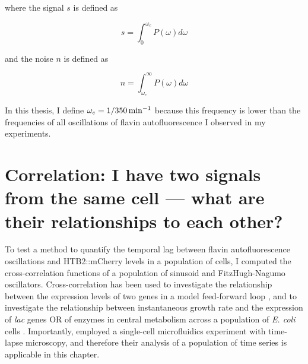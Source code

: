where the signal $s$ is defined as

\begin{equation}
  s = \int_{0}^{\omega_{c}} P(\omega) d\omega
  \label{eq:signal}
\end{equation}

and the noise $n$ is defined as

\begin{equation}
  n = \int_{\omega_{c}}^{\infty} P(\omega) d\omega
  \label{eq:noise}
\end{equation}

In this thesis, I define $\omega_{c} = \SI[parse-numbers=false]{1/350}{\minute^{-1}}$ because this frequency is lower than the frequencies of all oscillations of flavin autofluorescence I observed in my experiments.


\section[Correlation]{Correlation: I have two signals from the same cell --- what are their relationships to each other?}
\label{sec:analysis-correlation}


To test a method to quantify the temporal lag between flavin autofluorescence oscillations and HTB2::mCherry levels in a population of cells, I computed the cross-correlation functions of a population of sinusoid and FitzHugh-Nagumo oscillators.
Cross-correlation has been used to investigate the relationship between the expression levels of two genes in a model feed-forward loop \parencite{dunlopRegulatoryActivityRevealed2008},
and to investigate the relationship between instantaneous growth rate and the expression of \textit{lac} genes OR of enzymes in central metabolism across a population of \textit{E. coli} cells \parencite{kivietStochasticityMetabolismGrowth2014}.
Importantly, \textcite{kivietStochasticityMetabolismGrowth2014} employed a single-cell microfluidics experiment with time-lapse microscopy, and therefore their analysis of a population of time series is applicable in this chapter.

